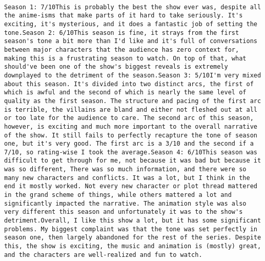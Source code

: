 \documentclass[
]{article}
\begin{document}
\begin{verbatim}
                                                                                                                                                                                                                                                                                                                                                                                                                                                                                                                                                                                                                                                                                                                                                                                                                                                                                                                                                                                                                                                                                                                                      Season 1: 7/10This is probably the best the show ever was, despite all the anime-isms that make parts of it hard to take seriously. It's exciting, it's mysterious, and it does a fantastic job of setting the tone.Season 2: 6/10This season is fine, it strays from the first season's tone a bit more than I'd like and it's full of conversations between major characters that the audience has zero context for, making this is a frustrating season to watch. On top of that, what should've been one of the show's biggest reveals is extremely downplayed to the detriment of the season.Season 3: 5/10I'm very mixed about this season. It's divided into two distinct arcs, the first of which is awful and the second of which is nearly the same level of quality as the first season. The structure and pacing of the first arc is terrible, the villains are bland and either not fleshed out at all or too late for the audience to care. The second arc of this season, however, is exciting and much more important to the overall narrative of the show. It still fails to perfectly recapture the tone of season one, but it's very good. The first arc is a 3/10 and the second if a 7/10, so rating-wise I took the average.Season 4: 6/10This season was difficult to get through for me, not because it was bad but because it was so different, There was so much information, and there were so many new characters and conflicts. It was a lot, but I think in the end it mostly worked. Not every new character or plot thread mattered in the grand scheme of things, while others mattered a lot and significantly impacted the narrative. The animation style was also very different this season and unfortunately it was to the show's detriment.Overall, I like this show a lot, but it has some significant problems. My biggest complaint was that the tone was set perfectly in season one, then largely abandoned for the rest of the series. Despite this, the show is exciting, the music and animation is (mostly) great, and the characters are well-realized and fun to watch.

\end{verbatim}
\end{document}
